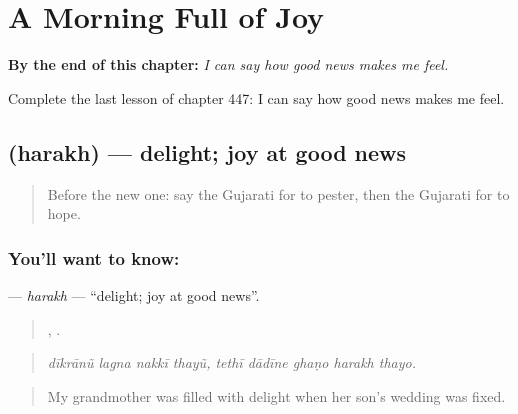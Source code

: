 
\chapter{A Morning Full of Joy}
\label{ch:gu-a-morning-full-of-joy}

\begin{chapteropening}
\textbf{By the end of this chapter:} \emph{I can say how good news makes me feel.}

Complete the last lesson of chapter 447: I can say how good news makes me feel.
\end{chapteropening}

\section[\texorpdfstring{\gu{હરખ} (harakh)}{હરખ (harakh)}]{ (harakh) — delight; joy at good news}

\label{lesson:GU-C447-harakh}



\begin{quote}
Before the new one: say the Gujarati for to pester, then the Gujarati for to hope.
\end{quote}

\subsection*{You'll want to know: }
\textbf{} — \emph{harakh} — \textquotedblleft{}delight; joy at good news\textquotedblright{}.

\begin{quote}
   ,     .
\end{quote}

\begin{quote}
\emph{dīkrānũ lagna nakkī thayũ, tethī dādīne ghaṇo harakh thayo.}
\end{quote}

\begin{quote}
My grandmother was filled with delight when her son's wedding was fixed.
\end{quote}

